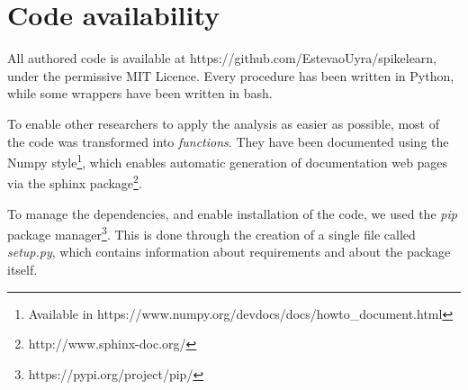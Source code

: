 \section{Code availability}
All authored code is available at https://github.com/EstevaoUyra/spikelearn, under the permissive MIT Licence. Every procedure has been written in Python, while some wrappers have been written in bash.

To enable other researchers to apply the analysis as easier as possible, most of the code was transformed into \textit{functions}. They have been documented using the Numpy style\footnote{Available in https://www.numpy.org/devdocs/docs/howto\_document.html}, which enables automatic generation of documentation web pages via the sphinx package\footnote{http://www.sphinx-doc.org/}. 

To manage the dependencies, and enable installation of the code, we used the \textit{pip} package manager\footnote{https://pypi.org/project/pip/}. This is done through the creation of a single file called \textit{setup.py}, which contains information about requirements and about the package itself.

